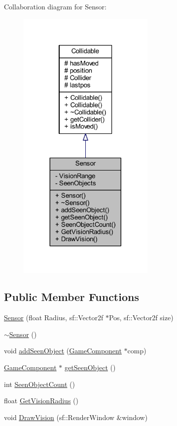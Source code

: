 Collaboration diagram for Sensor\-:\nopagebreak
\begin{figure}[H]
\begin{center}
\leavevmode
\includegraphics[width=188pt]{class_sensor__coll__graph}
\end{center}
\end{figure}
\subsection*{Public Member Functions}
\begin{DoxyCompactItemize}
\item 
\hyperlink{class_sensor_ac404bb7c1045796220e6d2997231feec}{Sensor} (float Radius, sf\-::\-Vector2f $\ast$Pos, sf\-::\-Vector2f size)
\item 
\hyperlink{class_sensor_aee8c70e7ef05ce65e7ee33686b5d7db2}{$\sim$\-Sensor} ()
\item 
void \hyperlink{class_sensor_a10dcb96d63d3991eff95b47f626d0e4c}{add\-Seen\-Object} (\hyperlink{class_game_component}{Game\-Component} $\ast$comp)
\item 
\hyperlink{class_game_component}{Game\-Component} $\ast$ \hyperlink{class_sensor_ac707ee7af9bd9adcdcb17d126582cc14}{get\-Seen\-Object} ()
\item 
int \hyperlink{class_sensor_ade01c8ff6de8daec5755b39bf4a57eae}{Seen\-Object\-Count} ()
\item 
float \hyperlink{class_sensor_ab7cc277606b8709a6df5fc53d7c0f22b}{Get\-Vision\-Radius} ()
\item 
void \hyperlink{class_sensor_a8ed4309852c92cdeac0152cc2f604ac8}{Draw\-Vision} (sf\-::\-Render\-Window \&window)
\end{DoxyCompactItemize}
